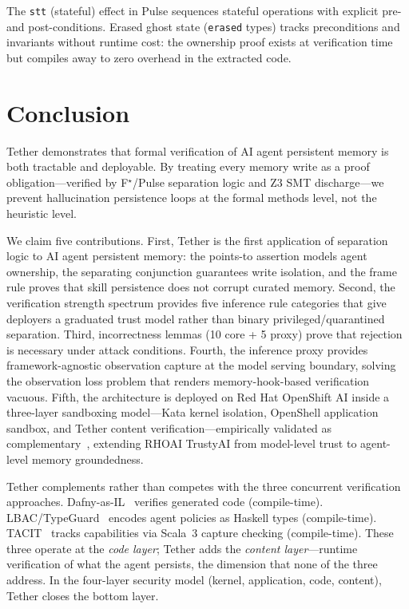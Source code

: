\documentclass[sigplan,screen,nonacm]{acmart}
\newcommand{\fstar}{F\ensuremath{^\star}}
\begin{document}
The \texttt{stt} (stateful) effect in Pulse sequences stateful
operations with explicit pre- and post-conditions. Erased ghost state
(\texttt{erased} types) tracks preconditions and invariants without
runtime cost: the ownership proof exists at verification time but
compiles away to zero overhead in the extracted code.


\section{Conclusion}
\label{sec:conclusion}

Tether demonstrates that formal verification of AI agent persistent memory
is both tractable and deployable. By treating every memory write as a proof
obligation---verified by \fstar{}/Pulse separation logic and Z3 SMT
discharge---we prevent hallucination persistence loops at the formal methods
level, not the heuristic level.

We claim five contributions. First, Tether is the first application of
separation logic to AI agent persistent memory: the points-to assertion
models agent ownership, the separating conjunction guarantees write
isolation, and the frame rule proves that skill persistence does not corrupt
curated memory. Second, the verification strength spectrum provides five
inference rule categories that give deployers a graduated trust model rather
than binary privileged/quarantined separation. Third, incorrectness lemmas
(10 core + 5 proxy) prove that rejection is necessary under attack
conditions. Fourth, the inference proxy provides framework-agnostic
observation capture at the model serving boundary, solving the observation
loss problem that renders memory-hook-based verification vacuous. Fifth, the
architecture is deployed on Red Hat OpenShift AI inside a three-layer
sandboxing model---Kata kernel isolation, OpenShell application sandbox,
and Tether content verification---empirically validated as
complementary~\cite{osc2026layered}, extending RHOAI TrustyAI from
model-level trust to agent-level memory groundedness.

Tether complements rather than competes with the three concurrent
verification approaches. Dafny-as-IL~\cite{li2025dafny} verifies generated
code (compile-time). LBAC/TypeGuard~\cite{zhou2026lbac} encodes agent
policies as Haskell types (compile-time). TACIT~\cite{odersky2026tacit}
tracks capabilities via Scala~3 capture checking (compile-time). These
three operate at the \emph{code layer}; Tether adds the \emph{content
layer}---runtime verification of what the agent persists, the dimension
that none of the three address. In the four-layer security model (kernel,
application, code, content), Tether closes the bottom layer.
\end{document}
